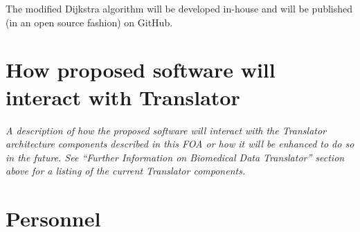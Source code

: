 \documentclass[11pt,notitlepage]{article}
\begin{document}
The modified Dijkstra algorithm will be developed in-house and will be published (in an open source fashion) on GitHub.


\section{How proposed software will interact with Translator}
\textit{A description of how the proposed software will interact with the Translator architecture
components described in this FOA or how it will be enhanced to do so in the future. See
“Further Information on Biomedical Data Translator” section above for a listing of the
current Translator components.}



\section{Personnel}



\end{document}
